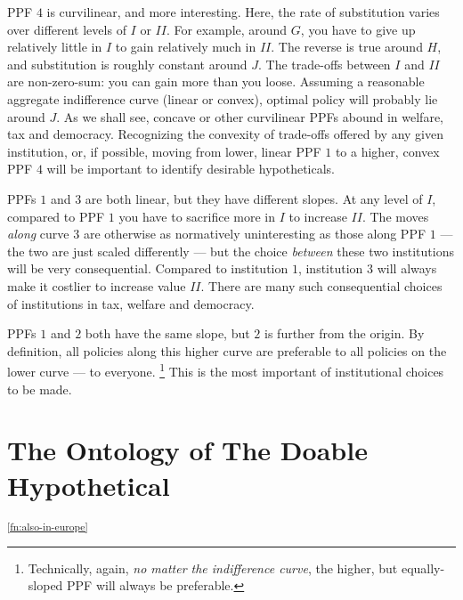 \gls{PPF} $4$ is curvilinear, and more interesting.
Here, the rate of substitution varies over different levels of $I$ or $II$.
For example, around $G$, you have to give up relatively little in $I$ to gain relatively much in $II$.
The reverse is true around $H$, and substitution is roughly constant around $J$.
The trade-offs between $I$ and $II$ are non-zero-sum:
you can gain more than you loose.
Assuming a reasonable aggregate indifference curve (linear or convex), optimal policy will probably lie around $J$.
As we shall see, concave or other curvilinear \glspl{PPF} abound in welfare, tax and democracy.
Recognizing the convexity of trade-offs offered by any given institution, or, if possible, moving from lower, linear \gls{PPF} $1$ to a higher, convex \gls{PPF} $4$ will be important to identify desirable hypotheticals.%

\glspl{PPF} $1$ and $3$ are both linear, but they have different slopes.
At any level of $I$, compared to \gls{PPF} $1$ you have to sacrifice more in $I$ to increase $II$.
The moves \emph{along} curve $3$ are otherwise as normatively uninteresting as those along \gls{PPF} $1$ --- the two are just scaled differently --- but the choice \emph{between} these two institutions will be very consequential.
Compared to institution $1$, institution $3$ will always make it costlier to increase value $II$.
There are many such consequential choices of institutions in tax, welfare and democracy.

\glspl{PPF} $1$ and $2$ both have the same slope, but $2$ is further from the origin.
By definition, all policies along this higher curve are preferable to all policies on the lower curve --- to everyone.
\footnote{
	Technically, again, \emph{no matter the indifference curve}, the higher, but equally-sloped \gls{PPF} will always be preferable.
}
This is the most important of institutional choices to be made.




\section[Ontology]{The Ontology of The Doable Hypothetical}
	\label{sec:ontology}
\textsuperscript{\ref{fn:also-in-europe}}


